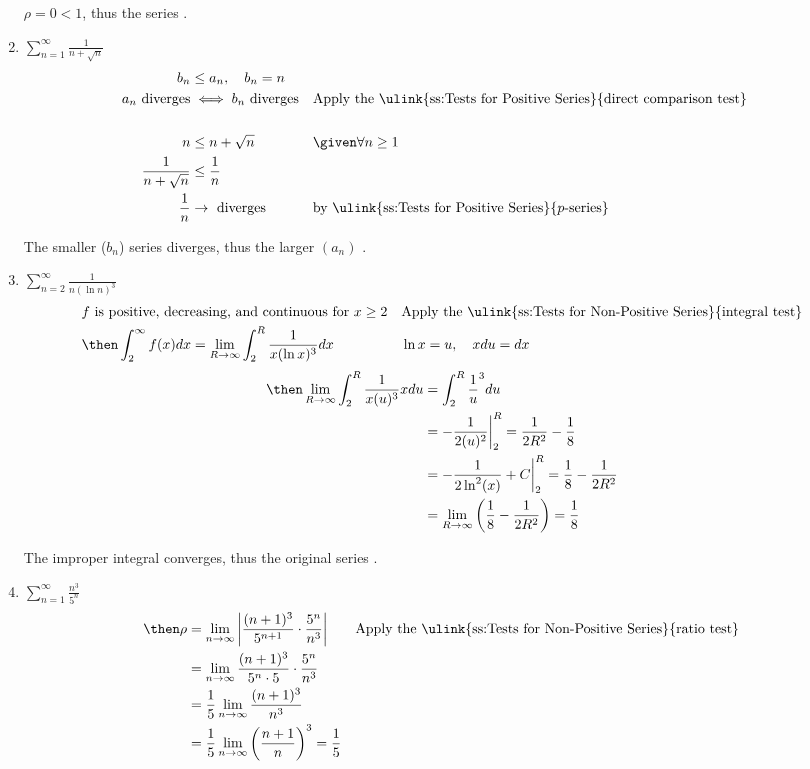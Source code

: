 \begin{enumerate}[itemsep=12em]
  \(\rho = 0 < 1\), thus the series .

  \vspace{-16pt}
  \item \(\displaystyle \sum_{n=1}^{\infty} \frac{1}{n + \sqrt{n} } \)
    \begin{align*}
      b_n &\leq a_n, \quad b_n = n \\
      a_n ~\text{diverges} &\iff b_n ~\text{diverges}
          && \text{Apply the \ulink{ss:Tests for Positive Series}{direct comparison test}} \\\\
      n &\leq n +\sqrt{n} && \given \forall n \geq 1 \\
      \frac{1}{n +\sqrt{n}} &\leq \frac{1}{n} \\
      \frac{1}{n} &\to ~\text{diverges}
      && \text{by \ulink{ss:Tests for Positive Series}{\(p\)-series}}
    \end{align*}

  The smaller (\(b_n\)) series diverges, thus the larger \((a_n)\) .

  \item \(\displaystyle \sum_{n=2}^{\infty} \frac{1}{n(\ln n)^3} \)
  \begin{align*}
    &f~\text{is positive, decreasing, and continuous for}~x\geq 2
    && \text{Apply the \ulink{ss:Tests for Non-Positive Series}{integral test}} \\
    &\then \int_{2}^{\infty} f(x)dx = \lim_{R \to \infty} \int_{2}^{R}
    \frac{1}{x(\ln x)^3} dx
    &&\ln x = u, \quad xdu = dx
  \end{align*}
  \begin{align*}
    \then \lim_{R \to \infty} \int_{2}^{R} \frac{1}{x(u)^3} xdu &= \int_{2}^{R} \frac{1}{u}^3 du \\
    &= -\frac{1}{2(u)^2} \bigg|_{2}^{R} = \frac{1}{2R^2} - \frac{1}{8} \\
    &= -\frac{1}{2\ln^2(x)} + C \bigg|_{2}^{R}
    = \frac{1}{8} - \frac{1}{2R^2} \\
    &= \lim_{R \to \infty} \left( \frac{1}{8} - \frac{1}{2R^2} \right) = \frac{1}{8}
  \end{align*}

  The improper integral converges, thus the original series .

  \vspace{-6em}
  \item \(\displaystyle \sum_{n=1}^{\infty} \frac{n^3}{5^n} \)
    \begin{align*}
      \then \rho &= \lim_{n \to \infty} \left| \frac{(n+1)^3}{5^{n+1} }
      \cdot \frac{5^n}{n^3} \right|
     && \text{Apply the \ulink{ss:Tests for Non-Positive Series}{ratio test}} \\
      &= \lim_{n \to \infty} \frac{(n+1)^3}{5^n \cdot 5} \cdot \frac{5^n}{n^3}\\
      &= \frac{1}{5} \lim_{n \to \infty} \frac{(n+1)^3}{n^3} \\
      &= \frac{1}{5} \lim_{n \to \infty} \left(\frac{n+1}{n}\right)^3 = \frac{1}{5}
    \end{align*}


\end{enumerate}
